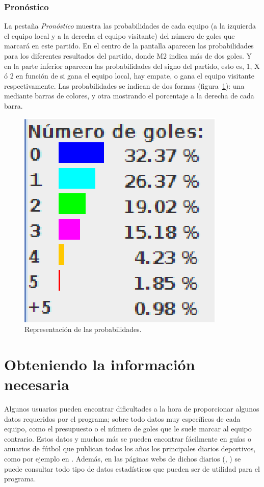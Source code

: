 \documentclass[a4paper,12pt]{article}
\begin{document}
\subsubsection{Pronóstico}
La pestaña \textit{Pronóstico} muestra las probabilidades de cada equipo (a la izquierda el equipo local y a la derecha el equipo visitante)
del número de goles que marcará en este partido.
En el centro de la pantalla aparecen las probabilidades para los diferentes resultados del partido, donde M2 indica más de dos goles.
Y en la parte inferior aparecen las probabilidades del signo del partido, esto es, 1, X ó 2 en función de si gana el equipo local, hay empate, o gana el equipo visitante respectivamente.
Las probabilidades se indican de dos formas (figura~\ref{fig:goles}): una mediante barras de colores, y otra mostrando el porcentaje a la derecha de cada barra.
\begin{figure}[h]
 \begin{center}
  \includegraphics[scale=0.5]{goles.eps}
\caption{Representación de las probabilidades.}
\label{fig:goles}
 \end{center}
\end{figure} 

\section{Obteniendo la información necesaria}
Algunos usuarios pueden encontrar dificultades a la hora de proporcionar algunos datos requeridos por el programa;
sobre todo datos muy específicos de cada equipo, como el presupuesto o el número de goles que le suele marcar al equipo contrario.
Estos datos y muchos más se pueden encontrar fácilmente en guías o anuarios de fútbol que publican todos los años los principales diarios deportivos, como por ejemplo en \cite{GM0910}.
Además, en las páginas webs de dichos diarios (\cite{WEBM}, \cite{WEBAS}) se puede consultar todo tipo de datos estadísticos que pueden ser de utilidad para el programa.
\end{document}
